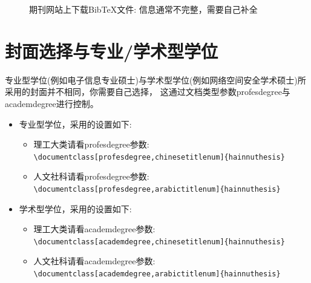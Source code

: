 \begin{figure}[hp]
\centering
{} 
\caption{期刊网站上下载BibTeX文件: 信息通常不完整，需要自己补全}
\label{ref-infor-not-complete}
\end{figure}

\section{封面选择与专业/学术型学位}

专业型学位(例如电子信息专业硕士)与学术型学位(例如网络空间安全学术硕士)所采用的封面并不相同，你需要自己选择，
这通过文档类型参数profesdegree与academdegree进行控制。
\begin{itemize}
\item 专业型学位，采用的设置如下:
	\begin{itemize}
	\item 理工大类请看profesdegree参数:\\
	  \verb|\documentclass[profesdegree,chinesetitlenum]{hainnuthesis}|
	\item 人文社科请看profesdegree参数:\\
	 \verb|\documentclass[profesdegree,arabictitlenum]{hainnuthesis}|
	\end{itemize} 
\item 学术型学位，采用的设置如下:
	\begin{itemize}
	\item 理工大类请看academdegree参数:\\
	 \verb|\documentclass[academdegree,chinesetitlenum]{hainnuthesis}|
	\item 人文社科请看academdegree参数:\\
	 \verb|\documentclass[academdegree,arabictitlenum]{hainnuthesis}|
	\end{itemize} 
\end{itemize}


